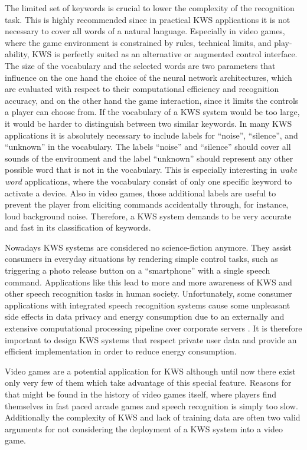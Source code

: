 The limited set of keywords is crucial to lower the complexity of the recognition task.
This is highly recommended since in practical KWS applications it is not necessary to cover all words of a natural language.
Especially in video games, where the game environment is constrained by rules, technical limits, and play-ability, KWS is perfectly suited as an alternative or augmented control interface.
The size of the vocabulary and the selected words are two parameters that influence on the one hand the choice of the neural network architectures, which are evaluated with respect to their computational efficiency and recognition accuracy, and on the other hand the game interaction, since it limits the controls a player can choose from.
If the vocabulary of a KWS system would be too large, it would be harder to distinguish between two similar keywords.
In many KWS applications it is absolutely necessary to include labels for \enquote{noise}, \enquote{silence}, and \enquote{unknown} in the vocabulary.
The labels \enquote{noise} and \enquote{silence} should cover all sounds of the environment and the label \enquote{unknown} should represent any other possible word that is not in the vocabulary.
This is especially interesting in \emph{wake word} applications, where the vocabulary consist of only one specific keyword to activate a device.
Also in video games, those additional labels are useful to prevent the player from eliciting commands accidentally through, for instance, loud background noise.
Therefore, a KWS system demands to be very accurate and fast in its classification of keywords.

Nowadays KWS systems are considered no science-fiction anymore.
They assist consumers in everyday situations by rendering simple control tasks, such as triggering a photo release button on a \enquote{smartphone} with a single speech command.
Applications like this lead to more and more awareness of KWS and other speech recognition tasks in human society.
Unfortunately, some consumer applications with integrated speech recognition systems cause some unpleasant side effects in data privacy and energy consumption due to an externally and extensive computational processing pipeline over corporate servers \cite{Tang2018}.
It is therefore important to design KWS systems that respect private user data and provide an efficient implementation in order to reduce energy consumption.

Video games are a potential application for KWS although until now there exist only very few of them which take advantage of this special feature.
Reasons for that might be found in the history of video games itself, where players find themselves in fast paced arcade games and speech recognition is simply too slow.
Additionally the complexity of KWS and lack of training data are often two valid arguments for not considering the deployment of a KWS system into a video game.

